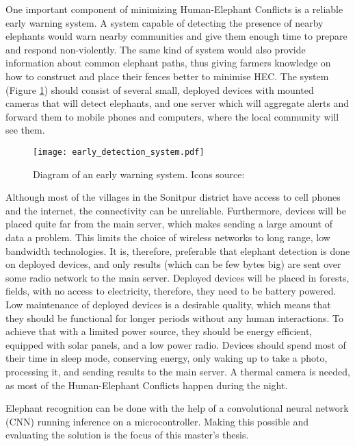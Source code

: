 One important component of minimizing Human-Elephant Conflicts is a reliable early warning system. 
A system capable of detecting the presence of nearby elephants would warn nearby communities and give them enough time to prepare and respond non-violently.
The same kind of system would also provide information about common elephant paths, thus giving farmers knowledge on how to construct and place their fences better to minimise HEC.
The system (Figure \ref{early_detection_system_diagram}) should consist of several small, deployed devices with mounted cameras that will detect elephants, and one server which will aggregate alerts and forward them to mobile phones and computers, where the local community will see them.

\begin{figure}[ht]
        \centering
        \texttt{[image: early\_detection\_system.pdf]} 
        \caption[Diagram of an early warning system.]{Diagram of an early warning system. Icons source:\cite{icons}}
        \label{early_detection_system_diagram}
\end{figure}

Although most of the villages in the Sonitpur district have access to cell phones and the internet, the connectivity can be unreliable\cite{wildlabs-elephants}. 
Furthermore, devices will be placed quite far from the main server, which makes sending a large amount of data a problem. 
This limits the choice of wireless networks to long range, low bandwidth technologies.
It is, therefore, preferable that elephant detection is done on deployed devices, and only results (which can be few bytes big) are sent over some radio network to the main server.
Deployed devices will be placed in forests, fields, with no access to electricity, therefore, they need to be battery powered.
Low maintenance of deployed devices is a desirable quality, which means that they should be functional for longer periods without any human interactions.
To achieve that with a limited power source, they should be energy efficient, equipped with solar panels, and a low power radio.
Devices should spend most of their time in sleep mode, conserving energy, only waking up to take a photo, processing it, and sending results to the main server.
A thermal camera is needed, as most of the Human-Elephant Conflicts happen during the night\cite{wildlabs-elephants}.

Elephant recognition can be done with the help of a convolutional neural network (CNN) running inference on a microcontroller. 
Making this possible and evaluating the solution is the focus of this master's thesis.


